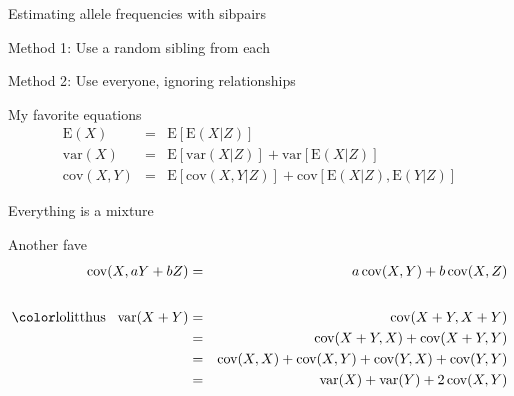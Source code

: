 \documentclass[aspectratio=169,12pt,t]{beamer}
\begin{document}
\begin{frame}{Estimating allele frequencies with sibpairs}

  \bigskip

  {\hilit Method 1}: Use a random sibling from each



  \bigskip \bigskip \bigskip

  {\hilit Method 2}: Use everyone, ignoring relationships





\note{
}

\end{frame}



\begin{frame}[c]{My favorite equations}
  \begin{eqnarray*}
    \text{E}(X) & = & \text{E}[ \text{E}(X|Z) ] \\[18pt]
    \text{var}(X) & = & \text{E}[ \text{var}(X|Z) ] + \text{var}[ \text{E}(X|Z) ] \\[18pt]
    \text{cov}(X,Y) & = & \text{E}[ \text{cov}(X,Y|Z) ] + \text{cov}[ \text{E}(X|Z), \text{E}(Y|Z) ]
  \end{eqnarray*}

  \bigskip\bigskip

  \hfill {\lolit Everything is a mixture}


\note{
}

\end{frame}


\begin{frame}[c]{Another fave}
  \begin{eqnarray*}
    \text{cov}(X, aY+bZ) & = & a \, \text{cov}(X,Y) + b \, \text{cov}(X,Z) \\[18pt]
    \text{{\lolit thus} \, var}(X+Y) & = & \text{cov}(X+Y,X+Y) \\
    & = & \text{cov}(X+Y, X) + \text{cov}(X+Y, Y) \\
    & = & \text{cov}(X, X) + \text{cov}(X, Y) + \text{cov}(Y,X) + \text{cov}(Y,Y) \\
    & = & \text{var}(X) + \text{var}(Y) + 2 \, \text{cov}(X,Y)
    \end{eqnarray*}

\note{
}

\end{frame}
\end{document}
